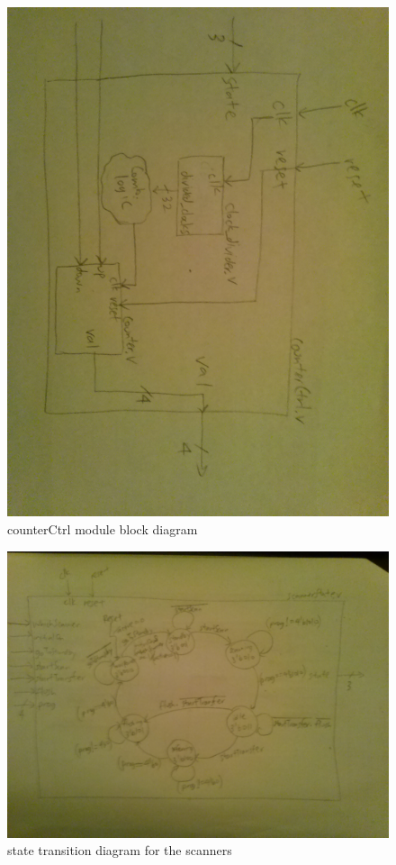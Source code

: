 \documentclass{article}
\begin{document}
      \begin{figure}[H]
        \centering
        \includegraphics[width=0.75\linewidth]{figures/block_diagrams/counterCtrl.jpg}
        \caption{counterCtrl module block diagram}
        \label{fig:counterCtrl_blockdiagram}
      \end{figure}

      \begin{figure}[H]
        \centering
        \includegraphics[width=0.75\linewidth]{figures/block_diagrams/scannerState.jpg}
        \caption{state transition diagram for the scanners}
        \label{fig:scannerState_FSM}
      \end{figure}
\end{document}

